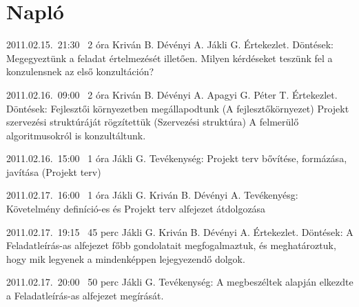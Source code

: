 %
\section{Napló}

\begin{naplo}

\bejegyzes
{2011.02.15.~21:30~}
{2 óra}
{Kriván B.\newline
Dévényi A.\newline
Jákli G.}
{Értekezlet.\newline
Döntések: Megegyeztünk a feladat értelmezését illetően.
Milyen kérdéseket teszünk fel a konzulensnek az első konzultáción?}

\bejegyzes
{2011.02.16.~09:00~}
{2 óra}
{Kriván B.\newline
Dévényi A.\newline
Apagyi G.\newline
Péter T.}
{Értekezlet.
Döntések:
Fejlesztői környezetben megállapodtunk (A fejlesztőkörnyezet)
Projekt szervezési struktúráját rögzítettük (Szervezési struktúra)
A felmerülő algoritmusokról is konzultáltunk.
}

\bejegyzes
{2011.02.16.~15:00~}
{1 óra}
{Jákli G.}
{Tevékenység: Projekt terv bővítése, formázása, javítása (Projekt terv)}

\bejegyzes
{2011.02.17.~16:00~}
{1 óra}
{Jákli G.\newline
Kriván B.\newline
Dévényi A.}
{Tevékenyésg: Követelmény definíció-es és Projekt terv alfejezet átdolgozása}

\bejegyzes
{2011.02.17.~19:15~}
{45 perc}
{Jákli G.\newline
Kriván B.\newline
Dévényi A.}
{Értekezlet.\newline
Döntések: A Feladatleírás-as alfejezet főbb gondolatait megfogalmaztuk, és meghatároztuk, hogy mik legyenek a mindenképpen lejegyezendő dolgok.}

\bejegyzes
{2011.02.17.~20:00~}
{50 perc}
{Jákli G.}
{Tevékenység: A megbeszéltek alapján elkezdte a Feladatleírás-as alfejezet megírását.}


\end{naplo}

